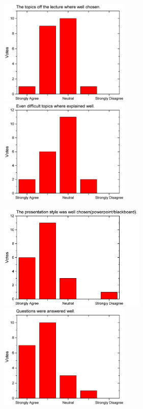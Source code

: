 \begin{figure}[H]
  \begin{minipage}{.48\linewidth}
    \centering
      {\includegraphics[height=50mm]{figures/n/Graph87.pdf}}
      {\includegraphics[height=50mm]{figures/n/Graph88.pdf}}
  \end{minipage}\quad
  \begin{minipage}{.48\linewidth}
    \centering
      {\includegraphics[height=50mm]{figures/n/Graph89.pdf}}
      {\includegraphics[height=50mm]{figures/n/Graph90.pdf}}
  \end{minipage}
\end{figure}
